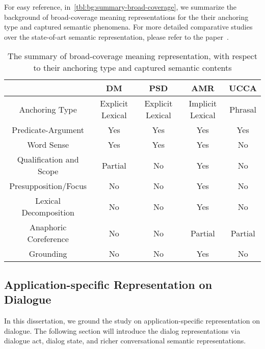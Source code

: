 For easy reference, in~\autoref{tbl:bg:summary-broad-coverage}, we
summarize the background of broad-coverage meaning representations for
the their anchoring type and captured semantic phenomena. For more
detailed comparative studies over the state-of-art semantic
representation, please refer to the paper~\citep{abend2017state}.

\begin{table}[ht]
\caption{The summary of broad-coverage meaning representation, with respect to their anchoring type and captured semantic contents}
  \begin{center}
\setlength{\tabcolsep}{4pt}
{
\begin{tabular}{c|cccc}
  \toprule
  \hline
  & {\bf DM}               & {\bf PSD}              & {\bf AMR}              & {\bf UCCA}    \\ \hline
  Anchoring Type          & Explicit Lexical & Explicit Lexical & Implicit Lexical & Phrasal \\ \hline
  Predicate-Argument      & Yes              & Yes              & Yes              & Yes     \\
  Word Sense              & Yes              & Yes              & Yes              & No      \\
  Qualification and Scope & Partial          & No               & Yes              & No      \\
  Presupposition/Focus    & No               & No               & Yes              & No      \\
  Lexical Decomposition   & No               & No               & Yes              & No      \\
  Anaphoric Coreference   & No               & No               & Partial          & Partial \\
  Grounding               & No               & No               & Yes              & No \\ \hline
  \bottomrule

\end{tabular}}
\end{center}
\label{tbl:bg:summary-broad-coverage}
\end{table}


\subsection{Application-specific Representation on Dialogue}
\label{ssec:bg:dialogue-mr}

In this dissertation, we ground the study on application-specific
representation on dialogue. The following section will introduce the
dialog representations via dialogue act, dialog state, and richer
conversational semantic representations.

